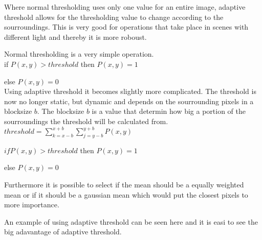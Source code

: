 Where normal thresholding uses only one value for an entire image, adaptive threshold allows for the thresholding value to change according to the sourroundings. This is very good for operations that take place in scenes with different light and thereby it is more roboust.

Normal thresholding is a very simple operation.\\

if $P(x,y) > threshold$ then $P(x,y) = 1$

else $P(x,y) = 0$\\

Using adaptive threshold it becomes slightly more complicated. The threshold is now no longer static, but dynamic and depends on the sourrounding pixels in a blocksize $b$. The blocksize $b$ is a value that determin how big a portion of the sourroundings the threshold will be calculated from.\\

$threshold = \sum_{k=x-b}^{x+b} \sum_{j=y-b}^{y+b} P(x,y)$

$if  P(x,y) > threshold$ then $P(x,y) = 1$

else $P(x,y) = 0$

Furthermore it is possible to select if the mean should be a equally weighted mean or if it should be a gaussian mean which would put the closest pixels to more importance.

An example of using adaptive threshold can be seen here and it is easi to see the big adavantage of adaptive threshold.